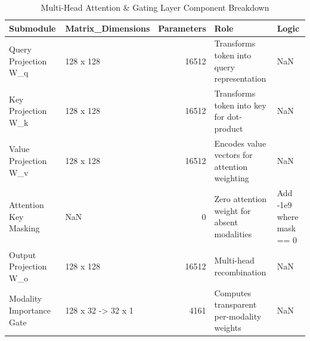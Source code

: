 \begin{table}
\caption{Multi-Head Attention & Gating Layer Component Breakdown}
\begin{tabular}{llrll}
\toprule
Submodule & Matrix_Dimensions & Parameters & Role & Logic \\
\midrule
Query Projection W_q & 128 x 128 & 16512 & Transforms token into query representation & NaN \\
Key Projection W_k & 128 x 128 & 16512 & Transforms token into key for dot-product & NaN \\
Value Projection W_v & 128 x 128 & 16512 & Encodes value vectors for attention weighting & NaN \\
Attention Key Masking & NaN & 0 & Zero attention weight for absent modalities & Add -1e9 where mask == 0 \\
Output Projection W_o & 128 x 128 & 16512 & Multi-head recombination & NaN \\
Modality Importance Gate & 128 x 32 -> 32 x 1 & 4161 & Computes transparent per-modality weights & NaN \\
\bottomrule
\end{tabular}
\end{table}
